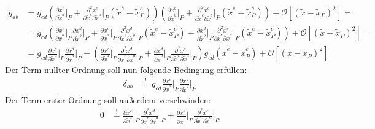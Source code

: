 \documentclass[a4paper,12pt]{article}
\newcommand{\kla}{}
\newcommand{\klam}{}
\begin{document}
\begin{align*}
\tilde{g}_{ab}&=g_{cd}\kla\left( {\frac{\partial x^c}{\partial\tilde{x}^a}\Big\vert_P+\frac{\partial^2x^c}{\partial\tilde{x}^e\partial\tilde{x}^a}\Big\vert_P(\tilde{x}^e-\tilde{x}^e_P)} \right)\kla\left( {\frac{\partial x^d}{\partial\tilde{x}^b}\Big\vert_P+\frac{\partial^2x^d}{\partial\tilde{x}^e\partial\tilde{x}^b}\Big\vert_P(\tilde{x}^e-\tilde{x}^e_P)} \right)+\mathcal{O}\klam\left[ {(\tilde{x}-\tilde{x}_P)^2} \right]=\\
&=g_{cd}\kla\left( {\frac{\partial x^c}{\partial\tilde{x}^a}\Big\vert_P\frac{\partial x^d}{\partial\tilde{x}^b}\Big\vert_P+\frac{\partial x^c}{\partial\tilde{x}^a}\Big\vert_P\frac{\partial^2x^d}{\partial\tilde{x}^e\partial\tilde{x}^b}\Big\vert_P(\tilde{x}^e-\tilde{x}^e_P)+\frac{\partial x^d}{\partial\tilde{x}^b}\Big\vert_P\frac{\partial^2x^c}{\partial\tilde{x}^e\partial\tilde{x}^a}\Big\vert_P(\tilde{x}^e-\tilde{x}^e_P)} \right)+\mathcal{O}\klam\left[ {(\tilde{x}-\tilde{x}_P)^2} \right]=\\
&=g_{cd}\frac{\partial x^c}{\partial\tilde{x}^a}\Big\vert_P\frac{\partial x^d}{\partial\tilde{x}^b}\Big\vert_P+\kla\left( {\frac{\partial x^c}{\partial\tilde{x}^a}\Big\vert_P\frac{\partial^2x^d}{\partial\tilde{x}^e\partial\tilde{x}^b}\Big\vert_P+\frac{\partial x^d}{\partial\tilde{x}^b}\Big\vert_P\frac{\partial^2x^c}{\partial\tilde{x}^e\partial\tilde{x}^a}\Big\vert_P} \right)g_{cd}(\tilde{x}^e-\tilde{x}^e_P)+\mathcal{O}\klam\left[ {(\tilde{x}-\tilde{x}_P)^2} \right]
\end{align*}
Der Term nullter Ordnung soll nun folgende Bedingung erfüllen:
\begin{align*}
\delta_{ab}&\overset{!}{=}g_{cd}\frac{\partial x^c}{\partial\tilde{x}^a}\Big\vert_P\frac{\partial x^d}{\partial\tilde{x}^b}\Big\vert_P
\end{align*}
Der Term erster Ordnung soll außerdem verschwinden:
\begin{align*}
0&\overset{!}{=}\frac{\partial x^c}{\partial\tilde{x}^a}\Big\vert_P\frac{\partial^2x^d}{\partial\tilde{x}^e\partial\tilde{x}^b}\Big\vert_P+\frac{\partial x^d}{\partial\tilde{x}^b}\Big\vert_P\frac{\partial^2x^c}{\partial\tilde{x}^e\partial\tilde{x}^a}\Big\vert_P
\end{align*}
\end{document}

